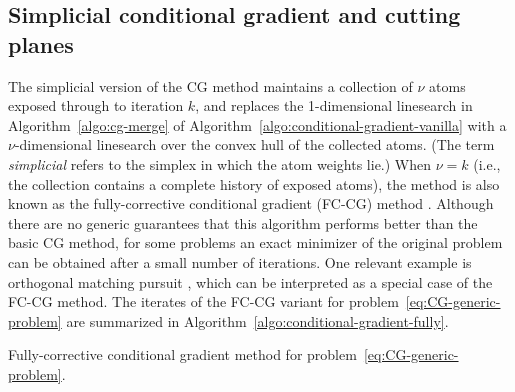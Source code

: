 \subsection{Simplicial conditional gradient and cutting planes}

The simplicial version of the CG method maintains a collection of $\nu$ atoms
exposed through to iteration $k$, and replaces the 1-dimensional linesearch in
Algorithm~\ref{algo:cg-merge} of Algorithm~\ref{algo:conditional-gradient-vanilla} with a
$\nu$-dimensional linesearch over the convex hull of the collected atoms. (The
term \emph{simplicial} refers to the simplex in which the atom weights lie.)
When $\nu=k$ (i.e., the collection contains a complete history of exposed
atoms), the method is also known as the fully-corrective conditional gradient
(FC-CG) method \cite{holloway1974extension,jaggi2013revisiting}. Although there
are no generic guarantees that this algorithm performs better than the basic CG
method, for some problems an exact minimizer of the original problem can be
obtained after a small number of iterations. One relevant example is orthogonal
matching pursuit \citep{trg07}, which can be interpreted as a special case of
the FC-CG method. The iterates of the FC-CG variant for
problem~\eqref{eq:CG-generic-problem} are summarized in
Algorithm~\ref{algo:conditional-gradient-fully}.


\begin{algorithm}[t]
  \DontPrintSemicolon\setcounter{AlgoLine}{-1}
    \caption{Fully-corrective conditional gradient method
    for problem~\eqref{eq:CG-generic-problem}.}
    \label{algo:conditional-gradient-fully}
\end{algorithm}

